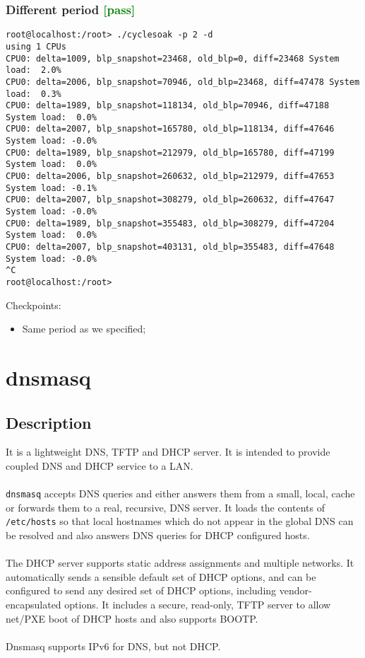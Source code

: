 \documentclass[a4paper]{report}
\begin{document}
\subsection{Different period \textcolor{green}{[pass]}}
\begin{lstlisting}
root@localhost:/root> ./cyclesoak -p 2 -d
using 1 CPUs
CPU0: delta=1009, blp_snapshot=23468, old_blp=0, diff=23468 System load:  2.0%
CPU0: delta=2006, blp_snapshot=70946, old_blp=23468, diff=47478 System load:  0.3%
CPU0: delta=1989, blp_snapshot=118134, old_blp=70946, diff=47188 System load:  0.0%
CPU0: delta=2007, blp_snapshot=165780, old_blp=118134, diff=47646 System load: -0.0%
CPU0: delta=1989, blp_snapshot=212979, old_blp=165780, diff=47199 System load:  0.0%
CPU0: delta=2006, blp_snapshot=260632, old_blp=212979, diff=47653 System load: -0.1%
CPU0: delta=2007, blp_snapshot=308279, old_blp=260632, diff=47647 System load: -0.0%
CPU0: delta=1989, blp_snapshot=355483, old_blp=308279, diff=47204 System load:  0.0%
CPU0: delta=2007, blp_snapshot=403131, old_blp=355483, diff=47648 System load: -0.0%
^C
root@localhost:/root> 
\end{lstlisting}
Checkpoints:
\begin{itemize}
    \item Same period as we specified;
\end{itemize}


\chapter{dnsmasq}
\section{Description}
It is a lightweight DNS, TFTP and DHCP server. It is intended to provide 
coupled DNS and DHCP service to a LAN.\\\\
{\tt dnsmasq}  accepts DNS queries and either answers them from a small, 
local, cache or forwards them to a real, recursive, DNS server.
It loads the contents of {\tt /etc/hosts} so that local hostnames which do 
not appear in the global DNS can be resolved and also answers
DNS queries for DHCP configured hosts.\\\\
The  DHCP server supports static address assignments and multiple networks. 
It automatically sends a sensible default set
of DHCP options, and can be configured to send any desired set of DHCP options, 
including vendor-encapsulated options. It includes a secure, read-only, 
TFTP server to allow net/PXE boot of DHCP hosts and also supports BOOTP.\\\\
Dnsmasq supports IPv6 for DNS, but not DHCP.
\end{document}
